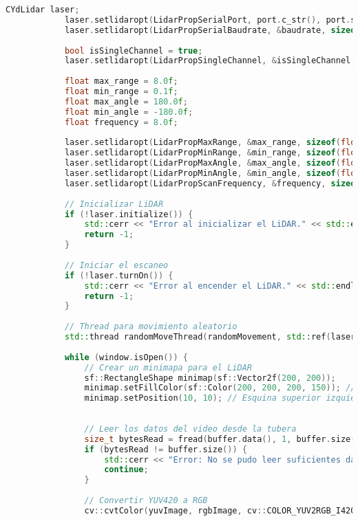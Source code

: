 \begin{lstlisting}[language={C++}, caption={Primer ajuste de c\'odigo}, label={Script}]
            CYdLidar laser;
            laser.setlidaropt(LidarPropSerialPort, port.c_str(), port.size());
            laser.setlidaropt(LidarPropSerialBaudrate, &baudrate, sizeof(int));
        
            bool isSingleChannel = true;
            laser.setlidaropt(LidarPropSingleChannel, &isSingleChannel, sizeof(bool));
        
            float max_range = 8.0f;
            float min_range = 0.1f;
            float max_angle = 180.0f;
            float min_angle = -180.0f;
            float frequency = 8.0f;
        
            laser.setlidaropt(LidarPropMaxRange, &max_range, sizeof(float));
            laser.setlidaropt(LidarPropMinRange, &min_range, sizeof(float));
            laser.setlidaropt(LidarPropMaxAngle, &max_angle, sizeof(float));
            laser.setlidaropt(LidarPropMinAngle, &min_angle, sizeof(float));
            laser.setlidaropt(LidarPropScanFrequency, &frequency, sizeof(float));
        
            // Inicializar LiDAR
            if (!laser.initialize()) {
                std::cerr << "Error al inicializar el LiDAR." << std::endl;
                return -1;
            }
        
            // Iniciar el escaneo
            if (!laser.turnOn()) {
                std::cerr << "Error al encender el LiDAR." << std::endl;
                return -1;
            }
        
            // Thread para movimiento aleatorio
            std::thread randomMoveThread(randomMovement, std::ref(laser));
        
            while (window.isOpen()) {
                // Crear un minimapa para el LiDAR
                sf::RectangleShape minimap(sf::Vector2f(200, 200));
                minimap.setFillColor(sf::Color(200, 200, 200, 150)); // Fondo semitransparente
                minimap.setPosition(10, 10); // Esquina superior izquierda
                
        
                // Leer los datos del video desde la tubera
                size_t bytesRead = fread(buffer.data(), 1, buffer.size(), pipe);
                if (bytesRead != buffer.size()) {
                    std::cerr << "Error: No se pudo leer suficientes datos de video." << std::endl;
                    continue;
                }
        
                // Convertir YUV420 a RGB
                cv::cvtColor(yuvImage, rgbImage, cv::COLOR_YUV2RGB_I420);
        

\end{lstlisting}
